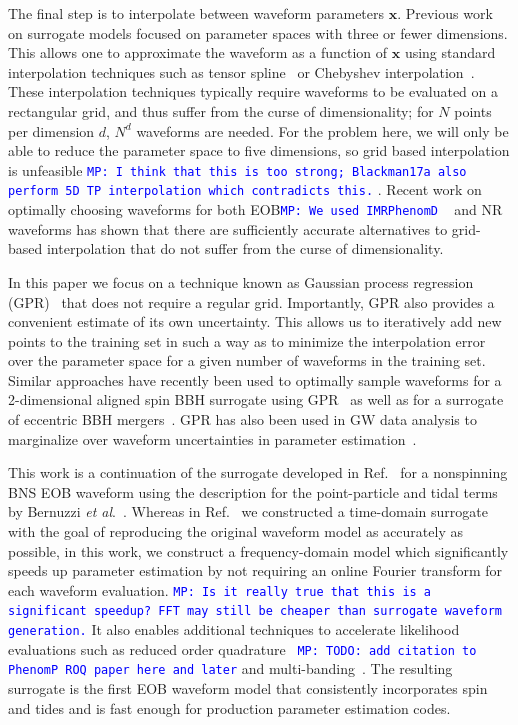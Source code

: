 \documentclass[prd,aps,letter,twocolumn,floatfix,notitlepage,nofootinbib]{revtex4-1}
\def\bx{\mathbf{x}}
\newcommand{\MP}[1]{{\textcolor{blue}{\texttt{MP: #1}} }}
\begin{document}
The final step is to interpolate between waveform parameters $\bx$. Previous work on surrogate models focused on parameter spaces with three or fewer dimensions. This allows one to approximate the waveform as a function of $\bx$ using standard interpolation techniques such as tensor spline~\cite{Puerrer2014, Puerrer2015} or Chebyshev interpolation~\cite{LackeyBernuzziGalley2017}. These interpolation techniques typically require waveforms to be evaluated on a rectangular grid, and thus suffer from the curse of dimensionality; for $N$ points per dimension $d$,  $N^d$ waveforms are needed. For the problem here, we will only be able to reduce the parameter space to five dimensions, so grid based interpolation is unfeasible \MP{I think that this is too strong; Blackman17a also perform 5D TP interpolation which contradicts this.}. Recent work on optimally choosing waveforms for both EOB\MP{We used IMRPhenomD}~\cite{DoctorFarrHolz2017} and NR~\cite{BlackmanFieldScheel2017a, BlackmanFieldScheel2017b} waveforms has shown that there are sufficiently accurate alternatives to grid-based interpolation that do not suffer from the curse of dimensionality.

In this paper we focus on a technique known as Gaussian process regression (GPR)~\cite{RasmussenWilliams2006} that does not require a regular grid. Importantly, GPR also provides a convenient estimate of its own uncertainty. This allows us to iteratively add new points to the training set in such a way as to minimize the interpolation error over the parameter space for a given number of waveforms in the training set. Similar approaches have recently been used to optimally sample waveforms for a 2-dimensional aligned spin BBH surrogate using GPR~\cite{DoctorFarrHolz2017} as well as for a surrogate of eccentric BBH mergers~\cite{HuertaMooreKumar2017}. GPR has also been used in GW data analysis to marginalize over waveform uncertainties in parameter estimation~\cite{MooreGair2014, MooreBerryChua2016}.

This work is a continuation of the surrogate developed in Ref.~\cite{LackeyBernuzziGalley2017} for a nonspinning BNS EOB waveform using the description for the point-particle and tidal terms by Bernuzzi {\it et al}.~\cite{Bernuzzi:2014owa}. Whereas in Ref.~\cite{LackeyBernuzziGalley2017} we constructed a time-domain surrogate with the goal of reproducing the original waveform model as accurately as possible, in this work, we construct a frequency-domain model which significantly speeds up parameter estimation by not requiring an online Fourier transform for each waveform evaluation. \MP{Is it really true that this is a significant speedup? FFT may still be cheaper than surrogate waveform generation.} It also enables additional techniques to accelerate likelihood evaluations such as reduced order quadrature~\cite{Antil2013, CanizaresFieldGair2013, CanizaresFieldGair2015} \MP{TODO: add citation to PhenomP ROQ paper here and later} and multi-banding~\cite{VinciguerraVeitchMandel2017}. The resulting surrogate is the first EOB waveform model that consistently incorporates spin and tides and is fast enough for production parameter estimation codes.
\end{document}
